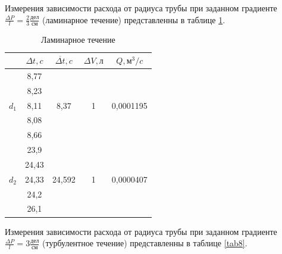 \documentclass[a4paper, 12pt]{article}
\begin{document}
\par Измерения зависимости расхода от радиуса трубы при заданном градиенте $\frac{\Delta{P}}{l} = \frac{2}{3}\frac{дел}{см}$ (ламинарное течение) представленны в таблице \ref{tab7}.
\begin{table}[h!]
\begin{center}
\begin{tabular}{|c|c|c|c|c|}
\hline
 & $\Delta{t}, c$ & $\overline{\Delta{t}}, c$ & $\Delta{V}, л$  & $Q, м^3/c$   \\ \hline
\multirow{5}{*}{$d_1$} & 8,77  & \multirow{5}{*}{8,37}          & \multirow{5}{*}{1} & \multirow{5}{*}{0,0001195} \\ \cline{2-2}
                    & 8,23  &                                &                    &                            \\ \cline{2-2}
                    & 8,11  &                                &                    &                            \\ \cline{2-2}
                    & 8,08  &                                &                    &                            \\ \cline{2-2}
                    & 8,66  &                                &                    &                            \\ \hline
\multirow{5}{*}{$d_2$} & 23,9  & \multirow{5}{*}{24,592}        & \multirow{5}{*}{1} & \multirow{5}{*}{0,0000407} \\ \cline{2-2}
                    & 24,43 &                                &                    &                            \\ \cline{2-2}
                    & 24,33 &                                &                    &                            \\ \cline{2-2}
                    & 24,2  &                                &                    &                            \\ \cline{2-2}
                    & 26,1  &                                &                    &                            \\ \hline
\end{tabular}
\caption{Ламинарное течение}
\label{tab7}
\end{center}
\end{table}
\par Измерения зависимости расхода от радиуса трубы при заданном градиенте $\frac{\Delta{P}}{l} = 3\frac{дел}{см}$ (турбулентное течение) представленны в таблице \ref{tab8}.
\end{document}
